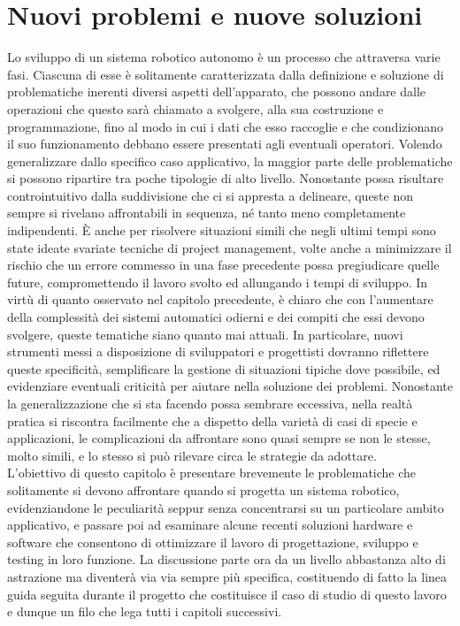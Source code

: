 
\chapter[Nuovi problemi e nuove soluzioni]{Nuovi problemi e nuove soluzioni}
\label{chap:Chapter2}
\doublespacing
\fontsize{12}{12}\selectfont

\indent Lo sviluppo di un sistema robotico autonomo è un processo che attraversa varie fasi. Ciascuna di esse è solitamente caratterizzata dalla definizione e soluzione di problematiche inerenti diversi aspetti dell'apparato, che possono andare dalle operazioni che questo sarà chiamato a svolgere, alla sua costruzione e programmazione, fino al modo in cui i dati che esso raccoglie e che condizionano il suo funzionamento debbano essere presentati agli eventuali operatori. Volendo generalizzare dallo specifico caso applicativo, la maggior parte delle problematiche si possono ripartire tra poche tipologie di alto livello. Nonostante possa risultare controintuitivo dalla suddivisione che ci si appresta a delineare, queste non sempre si rivelano affrontabili in sequenza, né tanto meno completamente indipendenti. È anche per risolvere situazioni simili che negli ultimi tempi sono state ideate svariate tecniche di project management, volte anche a minimizzare il rischio che un errore commesso in una fase precedente possa pregiudicare quelle future, compromettendo il lavoro svolto ed allungando i tempi di sviluppo. In virtù di quanto osservato nel capitolo precedente, è chiaro che con l'aumentare della complessità dei sistemi automatici odierni e dei compiti che essi devono svolgere, queste tematiche siano quanto mai attuali. In particolare, nuovi strumenti messi a disposizione di sviluppatori e progettisti dovranno riflettere queste specificità, semplificare la gestione di situazioni tipiche dove possibile, ed evidenziare eventuali criticità per aiutare nella soluzione dei problemi. Nonostante la generalizzazione che si sta facendo possa sembrare eccessiva, nella realtà pratica si riscontra facilmente che a dispetto della varietà di casi di specie e applicazioni, le complicazioni da affrontare sono quasi sempre se non le stesse, molto simili, e lo stesso si può rilevare circa le strategie da adottare.\\
L'obiettivo di questo capitolo è presentare brevemente le problematiche che solitamente si devono affrontare quando si progetta un sistema robotico, evidenziandone le peculiarità seppur senza concentrarsi su un particolare ambito applicativo, e passare poi ad esaminare alcune recenti soluzioni hardware e software che consentono di ottimizzare il lavoro di progettazione, sviluppo e testing in loro funzione. La discussione parte ora da un livello abbastanza alto di astrazione ma diventerà via via sempre più specifica, costituendo di fatto la linea guida seguita durante il progetto che costituisce il caso di studio di questo lavoro e dunque un filo che lega tutti i capitoli successivi.

